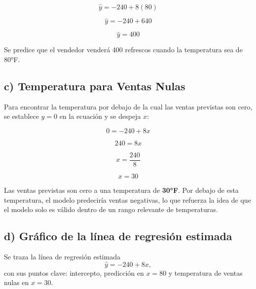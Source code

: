 \documentclass[12pt]{article}
\begin{document}
\[
\hat{y} = -240 + 8(80)
\]

\[
\hat{y} = -240 + 640
\]

\[
\hat{y} = 400
\]

Se predice que el vendedor venderá 400 refrescos cuando la temperatura sea de 80°F.

\subsection*{c) Temperatura para Ventas Nulas}

Para encontrar la temperatura por debajo de la cual las ventas previstas son cero, se establece 
$\hat{y} = 0$ en la ecuación y se despeja $x$:

\[
0 = -240 + 8x
\]

\[
240 = 8x
\]

\[
x = \frac{240}{8}
\]

\[
x = 30
\]

Las ventas previstas son cero a una temperatura de \textbf{30°F}. 
Por debajo de esta temperatura, el modelo predeciría ventas negativas, lo que refuerza la idea de 
que el modelo solo es válido dentro de un rango relevante de temperaturas.

\subsection*{d) Gráfico de la línea de regresión estimada}

Se traza la línea de regresión estimada
\[
\hat{y}=-240+8x,
\]
con sus puntos clave: intercepto, predicción en $x=80$ y temperatura de ventas nulas en $x=30$.
\end{document}
